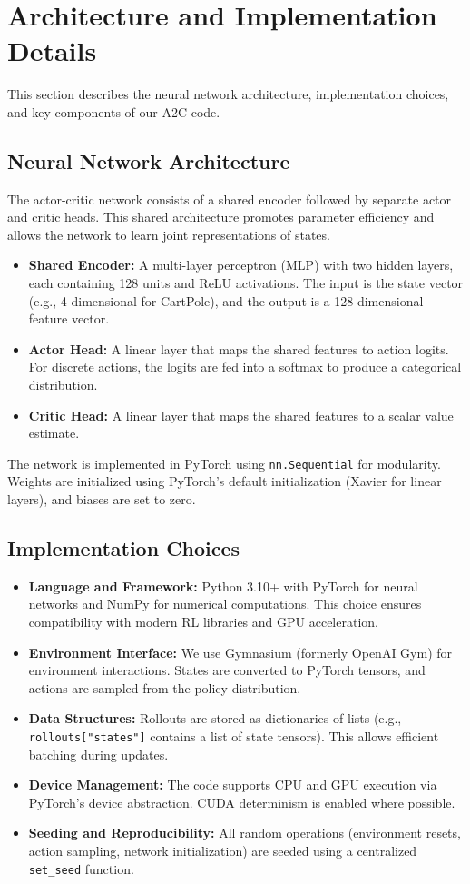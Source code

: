\documentclass[11pt]{article}
\begin{document}
\section{Architecture and Implementation Details}
This section describes the neural network architecture, implementation choices, and key components of our A2C code.

\subsection{Neural Network Architecture}
The actor-critic network consists of a shared encoder followed by separate actor and critic heads. This shared architecture promotes parameter efficiency and allows the network to learn joint representations of states.

\begin{itemize}
  \item \textbf{Shared Encoder:} A multi-layer perceptron (MLP) with two hidden layers, each containing 128 units and ReLU activations. The input is the state vector (e.g., 4-dimensional for CartPole), and the output is a 128-dimensional feature vector.
  \item \textbf{Actor Head:} A linear layer that maps the shared features to action logits. For discrete actions, the logits are fed into a softmax to produce a categorical distribution.
  \item \textbf{Critic Head:} A linear layer that maps the shared features to a scalar value estimate.
\end{itemize}

The network is implemented in PyTorch using \texttt{nn.Sequential} for modularity. Weights are initialized using PyTorch's default initialization (Xavier for linear layers), and biases are set to zero.

\subsection{Implementation Choices}
\begin{itemize}
  \item \textbf{Language and Framework:} Python 3.10+ with PyTorch for neural networks and NumPy for numerical computations. This choice ensures compatibility with modern RL libraries and GPU acceleration.
  \item \textbf{Environment Interface:} We use Gymnasium (formerly OpenAI Gym) for environment interactions. States are converted to PyTorch tensors, and actions are sampled from the policy distribution.
  \item \textbf{Data Structures:} Rollouts are stored as dictionaries of lists (e.g., \texttt{rollouts["states"]} contains a list of state tensors). This allows efficient batching during updates.
  \item \textbf{Device Management:} The code supports CPU and GPU execution via PyTorch's device abstraction. CUDA determinism is enabled where possible.
  \item \textbf{Seeding and Reproducibility:} All random operations (environment resets, action sampling, network initialization) are seeded using a centralized \texttt{set\_seed} function.
\end{itemize}
\end{document}
